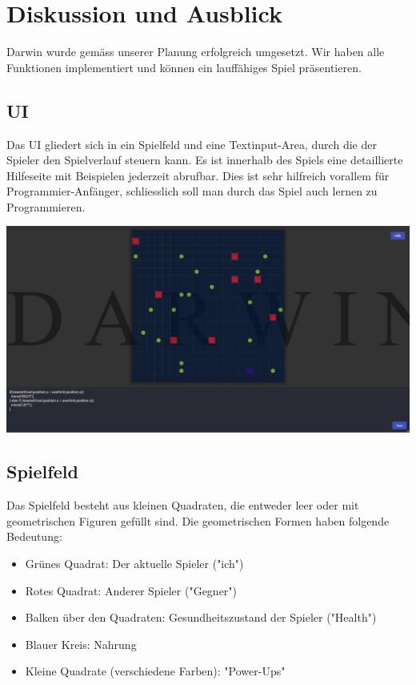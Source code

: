 \documentclass[11pt,a4paper,titlepage]{article}
\begin{document}
\newpage

\section{Diskussion und Ausblick}
%

Darwin wurde gemäss unserer Planung erfolgreich umgesetzt. Wir haben alle Funktionen implementiert und können ein lauffähiges Spiel präsentieren.

\subsection{UI}

Das UI gliedert sich in ein Spielfeld und eine Textinput-Area, durch die der Spieler den Spielverlauf steuern kann. Es ist innerhalb des Spiels eine detaillierte Hilfeseite mit Beispielen jederzeit abrufbar. Dies ist sehr hilfreich vorallem für Programmier-Anfänger, schliesslich soll man durch das Spiel auch lernen zu Programmieren.

\includegraphics[width=\textwidth]{darwin-gameplay.png}


\subsection{Spielfeld}

Das Spielfeld besteht aus kleinen Quadraten, die entweder leer oder mit geometrischen Figuren gefüllt sind. Die geometrischen Formen haben folgende Bedeutung:
\begin{itemize}
\item Grünes Quadrat: Der aktuelle Spieler ("ich")
\item Rotes Quadrat: Anderer Spieler ("Gegner")
\item Balken über den Quadraten: Gesundheitszustand der Spieler ("Health")
\item Blauer Kreis: Nahrung
\item Kleine Quadrate (verschiedene Farben): "Power-Ups"
\end{itemize}
\end{document}
